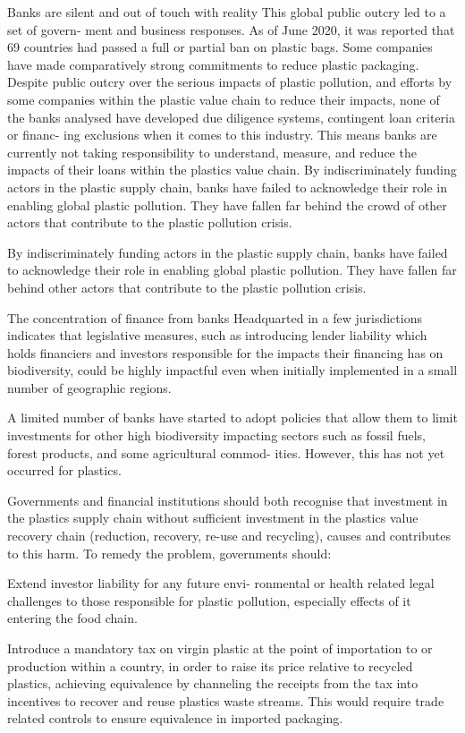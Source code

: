 \documentclass[
]{book}
\begin{document}
Banks are silent and out of touch
with reality
This global public outcry led to a set of govern-
ment and business responses. As of June 2020, it
was reported that 69 countries had passed a full or
partial ban on plastic bags. Some companies have
made comparatively strong commitments to reduce
plastic packaging. Despite public outcry over the serious impacts
of plastic pollution, and efforts by some companies
within the plastic value chain to reduce their impacts,
none of the banks analysed have developed due
diligence systems, contingent loan criteria or financ-
ing exclusions when it comes to this industry. This
means banks are currently not taking responsibility
to understand, measure, and reduce the impacts of
their loans within the plastics value chain.
By indiscriminately funding actors in the plastic
supply chain, banks have failed to acknowledge
their role in enabling global plastic pollution. They
have fallen far behind the crowd of other actors that
contribute to the plastic pollution crisis.

By indiscriminately funding actors in the plastic
supply chain, banks have failed to acknowledge
their role in enabling global plastic pollution.
They have fallen far behind other actors that
contribute to the plastic pollution crisis.

The concentration of finance
from banks Headquarted in
a few jurisdictions indicates
that legislative measures, such
as introducing lender liability
which holds financiers and
investors responsible for the
impacts their financing has on
biodiversity, could be highly
impactful even when initially
implemented in a small number
of geographic regions.

A limited number of banks have started to adopt
policies that allow them to limit investments for other
high biodiversity impacting sectors such as fossil
fuels, forest products, and some agricultural commod-
ities. However, this has not yet occurred for plastics.

Governments and financial institutions
should both recognise that investment in the plastics
supply chain without sufficient investment in the
plastics value recovery chain (reduction, recovery,
re-use and recycling), causes and contributes to this
harm. To remedy the problem, governments should:

Extend investor liability for any future envi-
ronmental or health related legal challenges
to those responsible for plastic pollution,
especially effects of it entering the food
chain.

Introduce a mandatory tax on virgin plastic
at the point of importation to or production
within a country, in order to raise its price
relative to recycled plastics, achieving
equivalence by channeling the receipts from
the tax into incentives to recover and reuse
plastics waste streams. This would require
trade related controls to ensure equivalence
in imported packaging.
\end{document}
